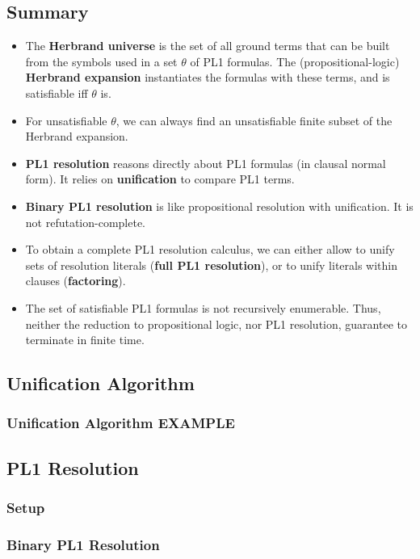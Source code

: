 \documentclass[conference, a4paper]{styles/acmsiggraph}
\begin{document}
    \subsection{Summary}
        \begin{itemize}
            \item The \textbf{Herbrand universe} is the set of all ground terms that can be built from the symbols used in a set $\theta$ of PL1 formulas. 
                The (propositional-logic) \textbf{Herbrand expansion} instantiates the formulas with these terms, and is satisfiable iff $\theta$ is.
            \item For unsatisfiable $\theta$, we can always find an unsatisfiable finite subset of the Herbrand expansion.
            \item \textbf{PL1 resolution} reasons directly about PL1 formulas (in clausal normal form).
                It relies on \textbf{unification} to compare PL1 terms.
            \item \textbf{Binary PL1 resolution} is like propositional resolution with unification. 
                It is not refutation-complete.
            \item To obtain a complete PL1 resolution calculus, we can either allow to unify sets of resolution literals (\textbf{full PL1 resolution}), or to unify literals within clauses (\textbf{factoring}).
            \item The set of satisfiable PL1 formulas is not recursively enumerable. 
                Thus, neither the reduction to propositional logic, nor PL1 resolution, guarantee to terminate in finite time.
        \end{itemize}
    
    \subsection{Unification Algorithm}
        \subsubsection{Unification Algorithm EXAMPLE}
    \subsection{PL1 Resolution}
        \subsubsection{Setup}
        \subsubsection{Binary PL1 Resolution}
\end{document}
